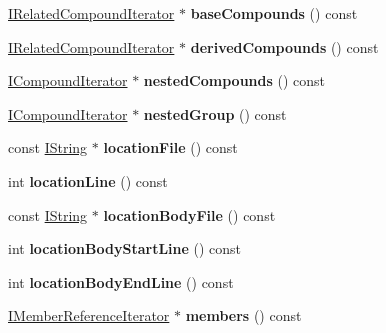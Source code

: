 \begin{DoxyCompactItemize}
\mbox{\hyperlink{class_i_related_compound_iterator}{I\+Related\+Compound\+Iterator}} $\ast$ {\bfseries base\+Compounds} () const
\item 
\mbox{\label{class_compound_handler_a6fa7198ae89dee940be30cb84987ad6a}} 
\mbox{\hyperlink{class_i_related_compound_iterator}{I\+Related\+Compound\+Iterator}} $\ast$ {\bfseries derived\+Compounds} () const
\item 
\mbox{\label{class_compound_handler_af911786614127e44b4fd71b6ec653038}} 
\mbox{\hyperlink{class_i_compound_iterator}{I\+Compound\+Iterator}} $\ast$ {\bfseries nested\+Compounds} () const
\item 
\mbox{\label{class_compound_handler_a9a5677801954f142e462699ee963e16e}} 
\mbox{\hyperlink{class_i_compound_iterator}{I\+Compound\+Iterator}} $\ast$ {\bfseries nested\+Group} () const
\item 
\mbox{\label{class_compound_handler_af812276a3cb5ddc7c5d88f92d7b74422}} 
const \mbox{\hyperlink{class_i_string}{I\+String}} $\ast$ {\bfseries location\+File} () const
\item 
\mbox{\label{class_compound_handler_a93842f35b8543c1d77ef89b47da8c51c}} 
int {\bfseries location\+Line} () const
\item 
\mbox{\label{class_compound_handler_a93a1bb1d9a1fbf35181074ce095bab1c}} 
const \mbox{\hyperlink{class_i_string}{I\+String}} $\ast$ {\bfseries location\+Body\+File} () const
\item 
\mbox{\label{class_compound_handler_a8bf56114aebb99a05611004ba25de44b}} 
int {\bfseries location\+Body\+Start\+Line} () const
\item 
\mbox{\label{class_compound_handler_a1f71fce84f72759cf5a8b751e3ccc6d5}} 
int {\bfseries location\+Body\+End\+Line} () const
\item 
\mbox{\label{class_compound_handler_a51566ac46005dfde577dfc9a65b1317d}} 
\mbox{\hyperlink{class_i_member_reference_iterator}{I\+Member\+Reference\+Iterator}} $\ast$ {\bfseries members} () const

\end{DoxyCompactItemize}
